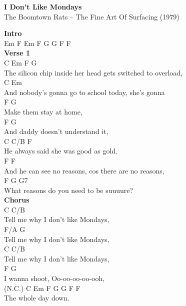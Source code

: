 \documentclass[a4paper]{article}
\begin{document}
    \begin{center}
        \textbf{I Don't Like Mondays}
        ~\\
        The Boomtown Rats -- The Fine Art Of Surfacing (1979)
    \end{center}
    {
        \scriptsize
        \textbf{Intro}
        ~\\
        {
            \cutive
            \obeyspaces
Em          F   Em               F     G G   F F
\\

        }
        \textbf{Verse 1}
        ~\\
        {
            \cutive
            \obeyspaces
    C              Em                F               G
\\
The silicon chip inside her head gets switched to overload,
\\
    C                    Em
\\
And nobody's gonna go to school today, she's gonna
\\
F                 G
\\
Make them stay at home,
\\
    F                  G
\\
And daddy doesn't understand it, 
\\
          C            C/B     F
\\
He always said she was good as gold.
\\
           F                         F
\\
And he can see no reasons, cos there are no reasons,
\\
     F                         G    G7
\\
What reasons do you need to be suuuure?
\\

        }
        \textbf{Chorus}
        ~\\
        {
            \cutive
            \obeyspaces
        C                C/B
\\
Tell me why I don't like Mondays,
\\
        F/A              G
\\
Tell me why I don't like Mondays,
\\
        C                C/B
\\
Tell me why I don't like Mondays,
\\
        F                  G
\\
I wanna shoot, Oo-oo-oo-oo-ooh,
\\
(N.C.)        C      Em   F    G G   F F
\\
The whole day down.
\\

}}
\end{document}
